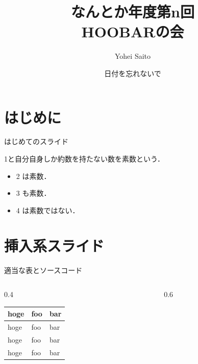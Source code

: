 \documentclass[dvipdfmx, a4p, cjk]{beamer}
\title{なんとか年度第n回 \\ HOOBARの会}
\author{Yohei Saito}
\institute[なんとか研究室]{信州大学 理工学科 なんとかかんとか研究室}
\date{日付を忘れないで}
\begin{document}
\frame{\titlepage \thispagestyle{empty}}
\frame{\tableofcontents \thispagestyle{empty}} 

\section{はじめに}
\begin{frame}{はじめてのスライド}
    \begin{definition}
    1と自分自身しか約数を持たない数を\alert{素数}という．
    \end{definition}
    \begin{example}
        \begin{itemize}
        \item 2 は素数．
        \item 3 も素数．
        \item 4 は素数ではない．
        \end{itemize}
    \end{example}
\end{frame}

\section{挿入系スライド}
\begin{frame}{適当な表とソースコード}
\begin{columns}
    \begin{column}{0.4\hsize}
    \begin{table}
    \begin{tabular}{lll}
        hoge & foo & bar \\ \hline
        hoge & foo & bar \\
        hoge & foo & bar \\
        hoge & foo & bar \\
    \end{tabular}
    \end{table}
    \end{column}
    \begin{column}{0.6\hsize}
        
    \end{column}
\end{columns}
\end{frame}
\end{document}
